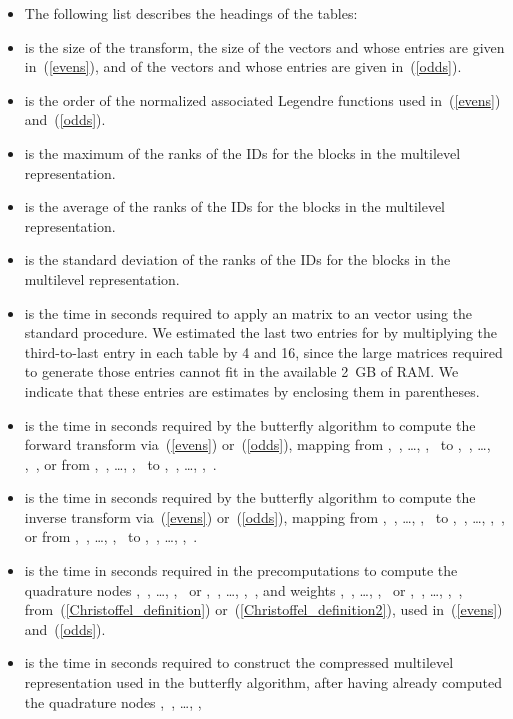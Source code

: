 \documentclass[final,3p,times]{elsarticle}
\begin{document}
\begin{itemize}
\item[] The following list describes the headings of the tables:
\item  is the size of the transform, the size of the vectors
       and  whose entries are given in~(\ref{evens}),
      and of the vectors  and  whose entries are given
      in~(\ref{odds}).
\item  is the order of the normalized associated Legendre functions
      used in~(\ref{evens}) and~(\ref{odds}).
\item  is the maximum of the ranks of the IDs for the blocks
      in the multilevel representation.
\item  is the average of the ranks of the IDs for the blocks
      in the multilevel representation.
\item  is the standard deviation of the ranks of the IDs
      for the blocks in the multilevel representation.
\item  is the time in seconds required to apply an 
      matrix to an  vector using the standard procedure.
      We estimated the last two entries for  by multiplying
      the third-to-last entry in each table by 4 and 16,
      since the large matrices required to generate those entries
      cannot fit in the available 2~GB of RAM. We indicate that these entries
      are estimates by enclosing them in parentheses.
\item  is the time in seconds required by the butterfly algorithm
      to compute the forward transform via~(\ref{evens}) or~(\ref{odds}),
      mapping from ,~, \dots, ,~
      to ,~, \dots, ,~,
      or from ,~, \dots, ,~
      to ,~, \dots, ,~.
\item  is the time in seconds required by the butterfly algorithm
      to compute the inverse transform via~(\ref{evens}) or~(\ref{odds}),
      mapping from ,~, \dots,
      ,~
      to ,~, \dots, ,~,
      or from ,~, \dots, ,~
      to ,~, \dots, ,~.
\item  is the time in seconds required in the precomputations
      to compute the quadrature nodes ,~, \dots, ,~
      or ,~, \dots, ,~,
      and weights ,~, \dots, ,~
      or ,~, \dots, ,~,
      from~(\ref{Christoffel_definition}) or~(\ref{Christoffel_definition2}),
      used in~(\ref{evens}) and~(\ref{odds}).
\item  is the time in seconds required to construct
      the compressed multilevel representation used in the butterfly algorithm,
      after having already computed
      the quadrature nodes ,~, \dots, ,~

\end{itemize}
\end{document}
